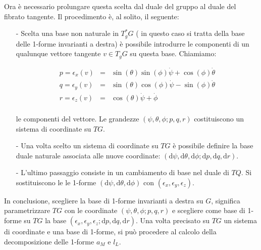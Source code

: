 \documentclass[11pt]{report}
\theoremstyle{plain}
\theoremstyle{definition}
\theoremstyle{remark}
\begin{document}
Ora è necessario prolungare questa scelta dal duale del gruppo al duale del fibrato tangente.
Il procedimento è, al solito, il seguente:
\begin{itemize}

\item[-] Scelta una base non naturale in $T^{\ast}_{g}G$ ( in questo caso si tratta della base delle 1-forme invarianti a destra) è possibile introdurre le componenti di un qualunque vettore tangente $v \in T_{g}G$ su questa base. Chiamiamo:

\begin{equation}\label{eq:quasivformeinvariantisinistracomponenti}
\begin{array}{rcl}
p = \epsilon_{x}(v) & = & \sin(\theta) \sin(\phi) \dot{\psi} + \cos(\phi)\dot{\theta} \\
q = \epsilon_{y}(v) & = & \sin(\theta)\cos(\phi)\dot{\psi} - \sin(\phi)\dot{\theta} \\
r = \epsilon_{z}(v) & = & \cos(\theta)\dot{\psi} + \dot{\phi} \\
\end{array}
\end{equation} 

le componenti del vettore.
Le grandezze $(\psi, \theta, \phi; p , q , r ) $ costituiscono un sistema di coordinate su  $TG$.



\item[-] Una volta scelto un sistema di coordinate su $TG$ è possibile definire la base duale naturale associata alle nuove coordinate: $(\textrm{d}\psi, \textrm{d}\theta, \textrm{d}\phi; \textrm{d}p , \textrm{d}q , \textrm{d}r ) $.

\item[-]L'ultimo passaggio consiste in un cambiamento di base nel duale di $TQ$. Si sostituiscono le le 1-forme $( \textrm{d}\psi, \textrm{d} \theta, \textrm{d} \phi)$ con $(\epsilon_{x}, \epsilon_{y}, \epsilon_{z})$.
\end{itemize}

In conclusione, scegliere la base di 1-forme invarianti a destra su $G$, significa parametrizzare $TG$ con le coordinate $(\psi, \theta, \phi; p , q , r )$ e scegliere come base di 1-forme su $TG$ la base $(\epsilon_{x}, \epsilon_{y}, \epsilon_{z}; \textrm{d}p , \textrm{d}q , \textrm{d}r )$.
Una volta precisato su $TG$ un sistema di coordinate e una base di 1-forme, si può procedere al calcolo della decomposizione delle 1-forme $a_{M}$ e $l_{L}$.
\end{document}
